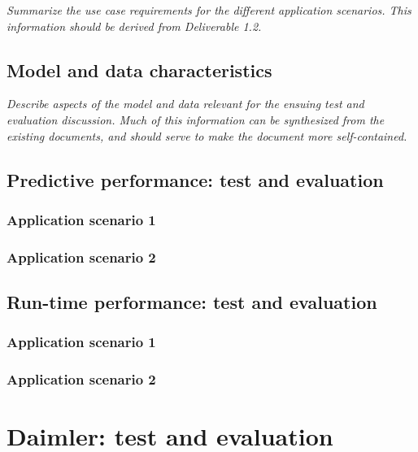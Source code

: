 \documentclass[11pt, oneside]{article}   	%
\numberwithin{figure}{section}
\numberwithin{equation}{section}
\numberwithin{table}{section}
\begin{document}
\emph{Summarize the use case requirements for the different application scenarios. This information should be
  derived from Deliverable 1.2.}

\subsection{Model and data characteristics}

\emph{Describe aspects of the model and data relevant for the ensuing test and evaluation discussion. Much of
  this information can be synthesized from the existing documents, and should serve to make the document more
  self-contained. }




\subsection{Predictive performance: test and evaluation}

\subsubsection{Application scenario 1}

\subsubsection{Application scenario 2}

\subsection{Run-time performance: test and evaluation}

\subsubsection{Application scenario 1}

\subsubsection{Application scenario 2}



\section{Daimler: test and evaluation}
\end{document}
